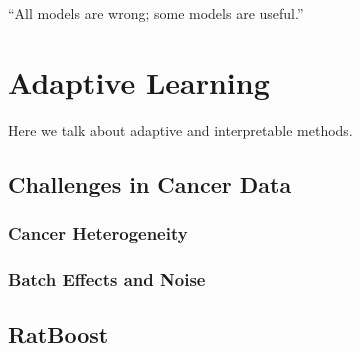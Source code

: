 \begin{savequote}[.5\linewidth]
  ``All models are wrong; some models are useful.''
\end{savequote}

\chapter{Adaptive Learning}
\label{sec:adaptive-learning}

Here we talk about adaptive and interpretable methods.

\section{Challenges in Cancer Data}
\subsection{Cancer Heterogeneity}

\subsection{Batch Effects and Noise}

\section{RatBoost}
\label{chap:ratboost-chapter}
